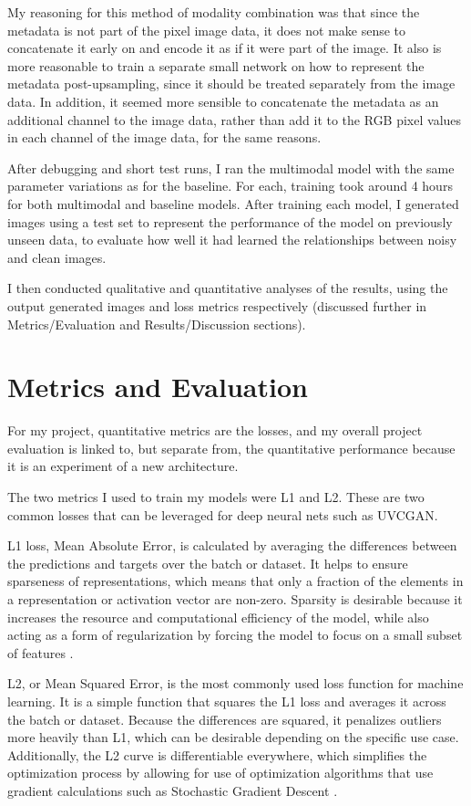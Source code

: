 \documentclass[10pt,twocolumn]{article}
\begin{document}
My reasoning for this method of modality combination was that since the metadata is not part of the pixel image data, it does not make sense to concatenate it early on and encode it as if it were part of the image. It also is more reasonable to train a separate small network on how to represent the metadata post-upsampling, since it should be treated separately from the image data. In addition, it seemed more sensible to concatenate the metadata as an additional channel to the image data, rather than add it to the RGB pixel values in each channel of the image data, for the same reasons.

After debugging and short test runs, I ran the multimodal model with the same parameter variations as for the baseline. For each, training took around 4 hours for both multimodal and baseline models. After training each model, I generated images using a test set to represent the performance of the model on previously unseen data, to evaluate how well it had learned the relationships between noisy and clean images.

I then conducted qualitative and quantitative analyses of the results, using the output generated images and loss metrics respectively (discussed further in Metrics/Evaluation and Results/Discussion sections).

\section{Metrics and Evaluation}

For my project, quantitative metrics are the losses, and my overall project evaluation is linked to, but separate from, the quantitative performance because it is an experiment of a new architecture.

The two metrics I used to train my models were L1 and L2. These are two common losses that can be leveraged for deep neural nets such as UVCGAN.

L1 loss, Mean Absolute Error, is calculated by averaging the differences between the predictions and targets over the batch or dataset. It helps to ensure sparseness of representations, which means that only a fraction of the elements in a representation or activation vector are non-zero. Sparsity is desirable because it increases the resource and computational efficiency of the model, while also acting as a form of regularization by forcing the model to focus on a small subset of features \cite{janochaloss}.

L2, or Mean Squared Error, is the most commonly used loss function for machine learning. It is a simple function that squares the L1 loss and averages it across the batch or dataset. Because the differences are squared, it penalizes outliers more heavily than L1, which can be desirable depending on the specific use case. Additionally, the L2 curve is differentiable everywhere, which simplifies the optimization process by allowing for use of optimization algorithms that use gradient calculations such as Stochastic Gradient Descent \cite{janochaloss}. 
\end{document}
